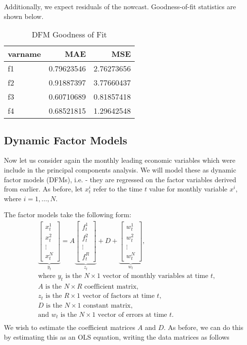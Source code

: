 \documentclass[11pt, letterpaper]{article}\usepackage[]{graphicx}\usepackage[]{color}
\begin{document}
Additionally, we expect residuals of the nowcast. Goodness-of-fit statistics are shown below.
\begin{table}[H]
\centering
\begingroup\footnotesize
\begin{tabular}{lrr}
  \hline
varname & MAE & MSE \\ 
  \hline
f1 & 0.79623546 & 2.76273656 \\ 
  f2 & 0.91887397 & 3.77660437 \\ 
  f3 & 0.60710689 & 0.81857418 \\ 
  f4 & 0.68521815 & 1.29642548 \\ 
   \hline
\end{tabular}
\endgroup
\caption{DFM Goodness of Fit} 
\end{table}




\subsection{Dynamic Factor Models}
Now let us consider again the monthly leading economic variables which were include in the principal components analysis. We will model these as dynamic factor models (DFMs), i.e. - they are regressed on the factor variables derived from earlier. As before, let $x^i_t$ refer to the time $t$ value for monthly variable $x^i$, where $i = 1, \dots, N$.

The factor models take the following form:
\begin{align*}
\underbrace{\begin{bmatrix}
	x^1_t\\
	x^2_t\\
	\vdots \\
	x^N_t
\end{bmatrix}}_{y_t}
=
A
\underbrace{\begin{bmatrix}
	f^1_{t}\\
	f^2_{t}\\
	\vdots \\
	f^R_{t}
\end{bmatrix}}_{z_t}
+
D 
+
\underbrace{\begin{bmatrix}
	w^1_t\\
	w^2_t\\
	\vdots\\
	w^N_t
\end{bmatrix}}_{w_t},\\
\text{where $y_t$ is the $N \times 1$ vector of monthly variables at time $t$,}\\
\text{$A$ is the $N \times R$ coefficient matrix,}\\
\text{$z_t$ is the $R \times 1$ vector of factors at time $t$,}\\
\text{$D$ is the $N \times 1$ constant matrix,}\\
\text{and $w_t$ is the $N \times 1$ vector of errors at time $t$.}\\
\end{align*}
We wish to estimate the coefficient matrices $A$ and $D$. As before, we can do this by estimating this as an OLS equation, writing the data matrices as follows
\end{document}
